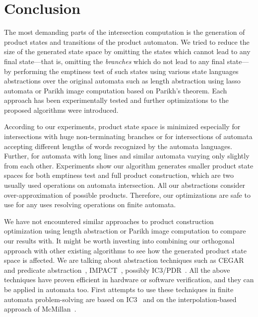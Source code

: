 \chapter{Conclusion}

The most demanding parts of the intersection computation is the generation of product states and transitions of the product automaton. We tried to reduce the size of the generated state space by omitting the states which cannot lead to any final state---that is, omitting the \textit{branches} which do not lead to any final state---by performing the emptiness test of such states using various state languages abstractions over the original automata such as length abstraction using lasso automata or Parikh image computation based on Parikh's theorem. Each approach has been experimentally tested and further optimizations to the proposed algorithms were introduced.

According to our experiments, product state space is minimized especially for intersections with huge non-terminating branches or for intersections of automata accepting different lengths of words recognized by the automata languages. Further, for automata with long lines and similar automata varying only slightly from each other. Experiments show our algorithm generates smaller product state spaces for both emptiness test and full product construction, which are two usually used operations on automata intersection. All our abstractions consider over-approximation of possible products. Therefore, our optimizations are safe to use for any uses resolving operations on finite automata.

We have not encountered similar approaches to product construction optimization using length abstraction or Parikh image computation to compare our results with. It might be worth investing into combining our orthogonal approach with other existing algorithms to see how the generated product state space is affected. We are talking about abstraction techniques such as CEGAR~\cite{DBLP:conf/cav/ClarkeGJLV00} and predicate abstraction~\cite{DBLP:conf/cav/ColonU98, DBLP:conf/cav/GrafS97}, IMPACT~\cite{DBLP:conf/cav/McMillan06}, possibly IC3/PDR~\cite{DBLP:conf/sat/HoderB12, DBLP:conf/fmcad/BradleyM07}. All the above techniques have proven efficient in hardware or software verification, and they can be applied in automata too. First attempts to use these techniques in finite automata problem-solving are based on IC3~\cite{DBLP:journals/pacmpl/HolikJLRV18, DBLP:conf/cav/WangTLYJ16, DBLP:journals/corr/abs-1708-09073} and on the interpolation-based approach of McMillan~\cite{DBLP:conf/tacas/AmlaM07, DBLP:conf/tacas/GangeNSSS13}.

